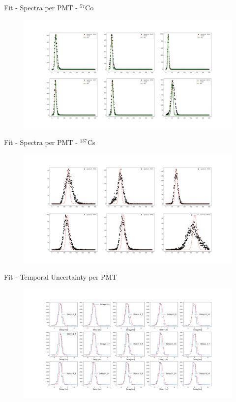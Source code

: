 \documentclass{beamer}
\begin{document}
\begin{frame}{Fit - Spectra per PMT - $^{57}$Co}
\begin{figure}[h]
\centering
\includegraphics[width=1\textwidth]{Co57Spec.png}
\end{figure}
\end{frame}

\begin{frame}{Fit - Spectra per PMT - $^{137}$Cs}
\begin{figure}[h]
\centering
\includegraphics[width=1\textwidth]{Cs137Spec.png}
\end{figure}
\end{frame}

\begin{frame}{Fit - Temporal Uncertainty per PMT}
\begin{figure}[h]
\centering
\includegraphics[width=1\textwidth]{Co57temp.png}
\end{figure}
\end{frame}
\end{document}
